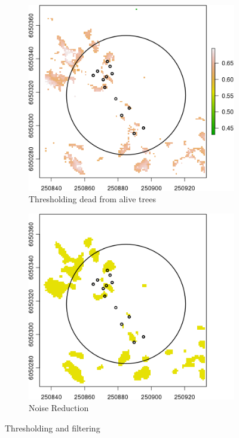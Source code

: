 \documentclass{subfiles}
\begin{document}
  \begin{figure} [h!]			
  	\begin{subfigure}[t]{.49\textwidth}
  		\centering
  		\includegraphics[width=\textwidth]{img/dead/c8_thresDead}
  		\caption{Thresholding dead from alive trees}
  		\label{fig:c8_deadThres}
  	\end{subfigure} \hfill
  	\begin{subfigure}[t]{.49\textwidth}
  		\centering
  		\includegraphics[width=\textwidth]{img/dead/c9_sharpFilter}
  		\caption{Noise Reduction} 
  		\label{fig:c9_sharpFilter}
  	\end{subfigure} \hfill
  \caption{Thresholding and filtering }  
  \label{fig:dt_sf} 
  \end{figure}
  
\end{document}
